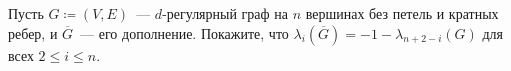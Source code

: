 Пусть $G \coloneqq (V, E)$~--- $d$-регулярный граф на $n$ вершинах без петель и кратных ребер, и
$\overline{G}$~--- его дополнение. Покажите, что $\lambda_i(\overline{G}) = -1 - \lambda_{n + 2 - i}(G)$
для всех $2 \le i \le n$.